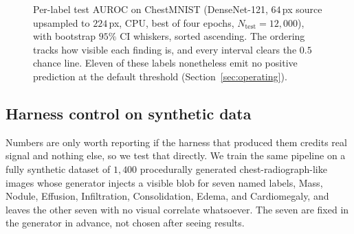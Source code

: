 \documentclass[10pt,twocolumn]{article}
\begin{document}
\begin{figure}[tbp]
\centering
{}
\caption{Per-label test AUROC on ChestMNIST (DenseNet-121, $64$\,px source
upsampled to $224$\,px, CPU, best of four epochs, $N_{\text{test}}{=}12{,}000$),
with bootstrap $95\%$ CI whiskers, sorted ascending. The ordering tracks how
visible each finding is, and every interval clears the $0.5$ chance line. Eleven
of these labels nonetheless emit no positive prediction at the default threshold
(Section~\ref{sec:operating}).}
\label{fig:cxr-auroc}
\end{figure}

\subsection{Harness control on synthetic data}
\label{sec:synthetic}
Numbers are only worth reporting if the harness that produced them credits real
signal and nothing else, so we test that directly. We train the same pipeline on a
fully synthetic dataset of $1{,}400$ procedurally generated chest-radiograph-like
images whose generator injects a visible blob for seven named labels, Mass,
Nodule, Effusion, Infiltration, Consolidation, Edema, and Cardiomegaly, and leaves
the other seven with no visual correlate whatsoever. The seven are fixed in the
generator in advance, not chosen after seeing results.
\end{document}
